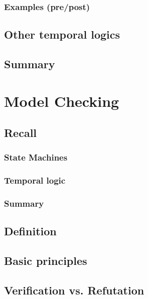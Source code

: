 \documentclass[12pt, a4paper]{book}
\begin{document}
  \subsubsection{Examples (pre/post)}
  \label{subs:Examples (pre/post)}
  \subsection{Other temporal logics}
  \label{sub:Other temporal logics}
  \subsection{Summary}
  \label{sub:Summary}






  \section{Model Checking}
  \label{sec:Model Checking}
  \subsection{Recall}
  \label{sub:Recall}
  \subsubsection{State Machines}
  \label{subs:State Machines}
  \subsubsection{Temporal logic}
  \label{subs:Temporal logic}
  \subsubsection{Summary}
  \label{subs:Summary}
  \subsection{Definition}
  \label{sub:Definition}
  \subsection{Basic principles}
  \label{sub:Basic principles}
  \subsection{Verification vs. Refutation}
  \label{sub:Verification vs. Refutation}
\end{document}

